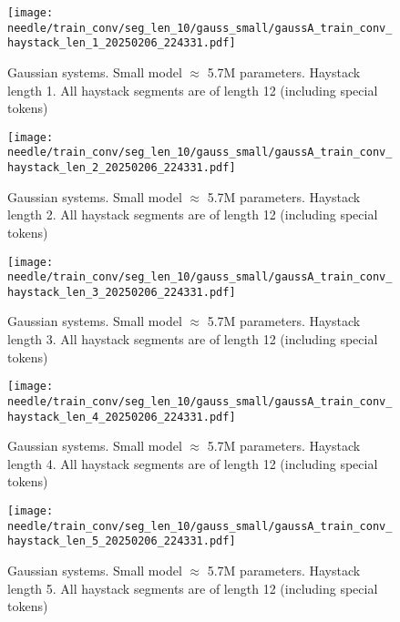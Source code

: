 \begin{figure}[h]
    \centering
    \texttt{[image: needle/train\_conv/seg\_len\_10/gauss\_small/gaussA\_train\_conv\_haystack\_len\_1\_20250206\_224331.pdf]}
    \caption{Gaussian systems. Small model $\approx$ 5.7M parameters. Haystack length 1. All haystack segments are of length 12 (including special tokens)}
    \label{fig:gauss_small_needle_train_conv_haystack_len_1_all_haystack_len_12}
\end{figure}

\begin{figure}[h]
    \centering
    \texttt{[image: needle/train\_conv/seg\_len\_10/gauss\_small/gaussA\_train\_conv\_haystack\_len\_2\_20250206\_224331.pdf]}
    \caption{Gaussian systems. Small model $\approx$ 5.7M parameters. Haystack length 2. All haystack segments are of length 12 (including special tokens)}
    \label{fig:gauss_small_needle_train_conv_haystack_len_2_all_haystack_len_12}

\end{figure}

\begin{figure}[h]
    \centering
    \texttt{[image: needle/train\_conv/seg\_len\_10/gauss\_small/gaussA\_train\_conv\_haystack\_len\_3\_20250206\_224331.pdf]}
    \caption{Gaussian systems. Small model $\approx$ 5.7M parameters. Haystack length 3. All haystack segments are of length 12 (including special tokens)}
    \label{fig:gauss_small_needle_train_conv_haystack_len_3_all_haystack_len_12}

\end{figure}

\begin{figure}[h]
    \centering
    \texttt{[image: needle/train\_conv/seg\_len\_10/gauss\_small/gaussA\_train\_conv\_haystack\_len\_4\_20250206\_224331.pdf]}
    \caption{Gaussian systems. Small model $\approx$ 5.7M parameters. Haystack length 4. All haystack segments are of length 12 (including special tokens)}
    \label{fig:gauss_small_needle_train_conv_haystack_len_4_all_haystack_len_12}

\end{figure}

\begin{figure}[h]
    \centering
    \texttt{[image: needle/train\_conv/seg\_len\_10/gauss\_small/gaussA\_train\_conv\_haystack\_len\_5\_20250206\_224331.pdf]}
    \caption{Gaussian systems. Small model $\approx$ 5.7M parameters. Haystack length 5. All haystack segments are of length 12 (including special tokens)}
    \label{fig:gauss_small_needle_train_conv_haystack_len_5_all_haystack_len_12}

\end{figure}

